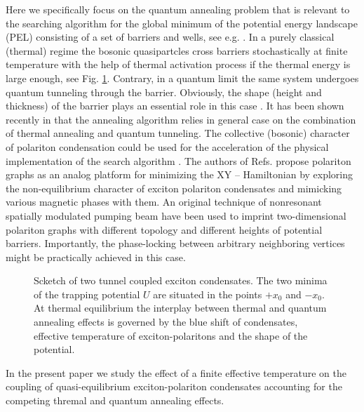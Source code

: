 \documentclass[aps, pre, preprint, groupedaddress, superscriptaddress, showkeys, showpacs] {revtex4-1}
\begin{document}
Here we specifically focus on the quantum annealing problem that is relevant to the searching algorithm for the global minimum of the potential energy landscape (PEL) consisting of a set of barriers and wells, see e.g.  \cite{Santoro, Das}.
In a purely classical  (thermal) regime the {bosonic quasipartcles cross barriers stochastically} at finite temperature with the help of thermal activation process if the thermal energy is large enough, see Fig. \ref{pic:potential_picture}. Contrary, in a quantum limit the same system undergoes quantum tunneling through the barrier. Obviously, the shape (height and thickness) of the barrier plays an essential role in this case \cite{Das, Lewenstein}. It has been shown recently in \cite{Lewenstein} that the annealing algorithm relies in general case on the combination of thermal annealing and quantum tunneling. The     
collective (bosonic) character of polariton condensation could be used for the acceleration of the physical implementation of the search algorithm \cite{Yan}. The authors of Refs. \cite{Lago1, Lago2} propose polariton graphs as an analog platform for minimizing the XY -- Hamiltonian by exploring the non-equilibrium character of exciton polariton condensates and mimicking various magnetic phases with them.  An original technique of nonresonant spatially  modulated pumping beam  have been used to imprint two-dimensional polariton graphs with different topology and different heights of potential barriers. Importantly, the phase-locking  between arbitrary neighboring vertices might be practically achieved in this case.
%
\begin{figure}[ht]
\caption{Scketch of two tunnel coupled exciton condensates. The two minima of the trapping potential $U$ are situated in the points $+x_0$ and $-x_0$. At thermal equilibrium the interplay between thermal and quantum annealing effects is governed by the blue shift of condensates, effective temperature of exciton-polaritons and the shape of the potential. \label{pic:potential_picture}}
\end{figure} 
%
In the present paper we study the effect of a finite effective temperature on the coupling of quasi-equilibrium exciton-polariton condensates accounting for the competing thremal and quantum annealing effects.  
\end{document}
